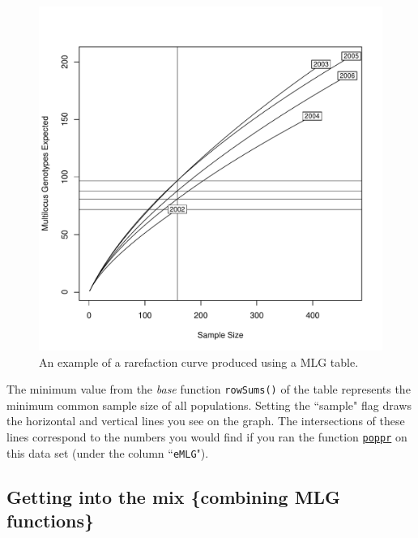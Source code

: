 \documentclass[letterpaper]{article}\usepackage[]{graphicx}\usepackage[]{color}
\newenvironment{knitrout}{}{} %
\newcommand{\cmdlink}[2]{
  \texttt{\hyperref[#1]{#2}}
}
\begin{document}
\begin{figure}[h!]
  \centering
  \caption{\footnotesize An example of a rarefaction curve produced using a MLG table.}
  \label{rarecurve}
\begin{knitrout}\footnotesize
{}\color{fgcolor}

{\centering \includegraphics[width=0.5\linewidth]{figure/mlgrareplot} 

}



\end{knitrout}

\end{figure}
\newpage

The minimum value from the \textit{base} function \texttt{rowSums()} of the table represents the minimum common sample size of all populations. Setting the ``sample" flag draws the horizontal and vertical lines you see on the graph. The intersections of these lines correspond to the numbers you would find if you ran the function \cmdlink{summary:poppr}{poppr}on this data set (under the column ``\texttt{eMLG}").
%
\subsection{Getting into the mix \{combining MLG functions\}}
\label{mlg:mix}
\end{document}
